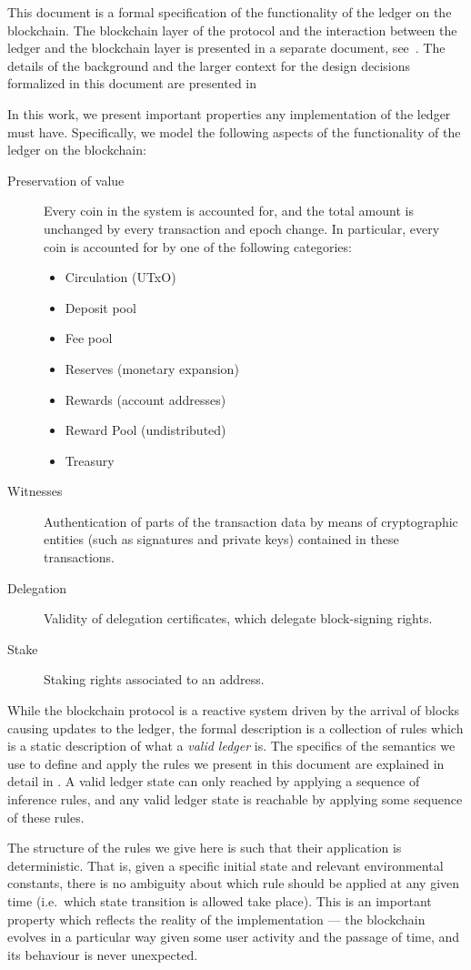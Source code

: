 This document is a formal specification of the functionality of the ledger
on the blockchain. The blockchain layer of the
protocol and the interaction between the ledger and the blockchain
layer is presented in a separate document, see~\cite{shelley_consensus}. The details of the
background and the larger context
for the design decisions formalized in this document are presented
in~\cite{delegation_design}

In this work,
we present important properties any implementation of the ledger must have.
Specifically, we model the following aspects
of the functionality of the ledger on the blockchain:

\begin{description}
\item[Preservation of value] Every coin in the system is accounted for,
  and the total amount is unchanged by every transaction and epoch change.
  In particular, every coin is accounted for by one of the following categories:
  \begin{itemize}
    \item Circulation (UTxO)
    \item Deposit pool
    \item Fee pool
    \item Reserves (monetary expansion)
    \item Rewards (account addresses)
    \item Reward Pool (undistributed)
    \item Treasury
  \end{itemize}
\item[Witnesses] Authentication of parts of the transaction data by means of
  cryptographic entities (such as signatures and private keys) contained in
  these transactions.
\item[Delegation] Validity of delegation certificates, which delegate
  block-signing rights.
\item[Stake] Staking rights associated to an address.
\end{description}

While the blockchain protocol is a reactive system driven by the arrival
of blocks causing updates to the ledger, the formal description is a collection
of rules which is a
static description of what a \textit{valid ledger} is. The specifics of the
semantics we use to define and apply
the rules we present in this document are explained in detail in
\cite{small_step_semantics}. A valid ledger state can only
reached by applying a sequence of inference rules, and any valid ledger state
is reachable by applying some sequence of these rules.

The structure of the rules we give here is such that their application is
deterministic. That is, given a specific initial state and relevant environmental
constants, there is no ambiguity
about which rule should be applied at any given time (i.e.~which state
transition is allowed take place). This is an important property which reflects
the reality of the implementation --- the blockchain evolves in a particular way
given some user activity and the passage of time, and its behaviour is
never unexpected.
